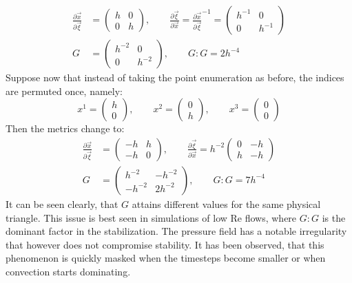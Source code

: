 \begin{equation*}
	\begin{split}
		\frac{\partial \vec{x}}{\partial \vec{\xi}} &= \begin{pmatrix}
			h & 0 \\
			0 & h
		\end{pmatrix},\qquad
		\frac{\partial \vec\xi}{\partial \vec{x}} = \frac{\partial \vec{x}}{\partial \vec\xi}^{-1} = \begin{pmatrix}
			h^{-1} & 0      \\
			0      & h^{-1}
		\end{pmatrix}\\[1em]
		G &= \begin{pmatrix}
			h^{-2} & 0      \\
			0      & h^{-2}
		\end{pmatrix}, \qquad G:G = 2h^{-4}
	\end{split}
\end{equation*}
Suppose now that instead of taking the point enumeration as before, the indices are permuted once, namely:
\begin{equation*}
	x^1 = \begin{pmatrix}
		h \\
		0
	\end{pmatrix},\qquad
	x^2 = \begin{pmatrix}
		0 \\
		h
	\end{pmatrix},\qquad
	x^3 = \begin{pmatrix}
		0 \\
		0
	\end{pmatrix}
\end{equation*}
Then the metrics change to:
\begin{equation*}
	\begin{split}
		\frac{\partial \vec{x}}{\partial \vec{\xi}} &= \begin{pmatrix}
			-h & h \\
			-h & 0
		\end{pmatrix},\qquad
		\frac{\partial \vec{\xi}}{\partial \vec{x}} = h^{-2}\begin{pmatrix}
			0 & -h \\
			h & -h
		\end{pmatrix}
		\\[1em]
		G &= \begin{pmatrix}
			h^{-2}  & -h^{-2} \\
			-h^{-2} & 2h^{-2}
		\end{pmatrix},\qquad
		G:G = 7h^{-4}
	\end{split}
\end{equation*}
It can be seen clearly, that $G$ attains different values for the same physical triangle. This issue is best seen in simulations of low Re flows, where $G:G$ is the dominant factor in the stabilization. The pressure field has a notable irregularity that however does not compromise stability. It has been observed, that this phenomenon is quickly masked when the timesteps become smaller or when convection starts dominating.

